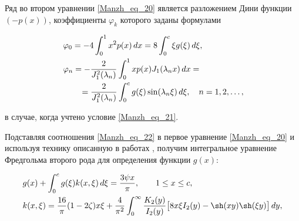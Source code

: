 Ряд во втором уравнении \eqref{Manzh_eq_20} является разложением Дини \cite{Manzh_bib_12} функции $(-p(x))$, коэффициенты $\varphi_k$  которого заданы формулами

\begin{align}\label{Manzh_eq_22}%

\hskip-4em

\begin{aligned}

  &

  \varphi_0=-4\int_0^1x^2p(x)\,dx=8\int_0^c\xi g(\xi)\,d\xi,

\\

  &

  \varphi_n=-\frac{2}{J_1^2(\lambda_n)}\int_0^1xp(x)J_1(\lambda_nx)\,dx =

\\

  &

  \hskip2em

  =\frac{2}{J_1^2(\lambda_n)}\int_0^cg(\xi)\sin(\lambda_n\xi)\,d\xi,\quad

  n=1, 2,\ldots,

\end{aligned}

\hskip-4em

\end{align}

в случае, когда учтено условие \eqref{Manzh_eq_21}.



Подставляя соотношения \eqref{Manzh_eq_22} в первое уравнение \eqref{Manzh_eq_20} и используя технику описанную в работах \cite{Manzh_bib_11,Manzh_bib_13,Manzh_bib_14,Manzh_bib_15}, получим интегральное уравнение Фредгольма второго рода для определения функции $g(x)$:

\begin{align}\label{Manzh_eq_23}%

&

  g(x)+\int_0^cg(\xi)k(x,\xi)\,d\xi=\frac{3\psi x}\pi,\qquad

  1\leq x\leq c,

\\

  &

  k(x,\xi)=\frac{16}\pi(1-2\zeta)x\xi

  +\frac4{\pi^2}\int_0^\infty\frac{K_2(y)}{I_2(y)}\bigl[8x\xi I_2(y)-\sh(xy)\sh(\xi y)\bigr]\,dy,

\end{align}

